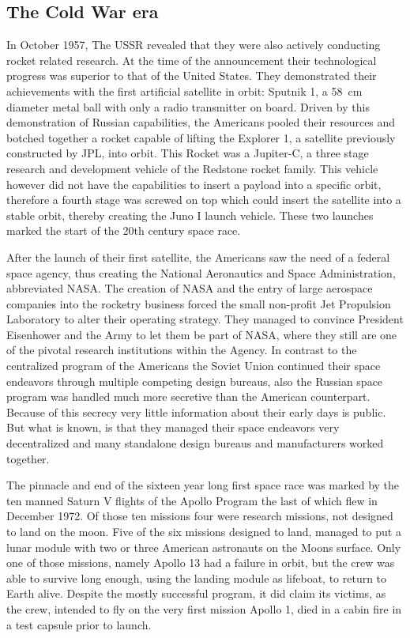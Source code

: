 \subsection{The Cold War era}

In October 1957, The USSR revealed that they were also actively conducting rocket related research. At the time of the announcement their technological progress was superior to that of the United States. They demonstrated their achievements with the first artificial satellite in orbit: Sputnik 1, a \SI{58}{\centi\meter} diameter metal ball with only a radio transmitter on board. Driven by this demonstration of Russian capabilities, the Americans pooled their resources and botched together a rocket capable of lifting the Explorer 1, a satellite previously constructed by JPL, into orbit. This Rocket was a Jupiter-C, a three stage research and development vehicle of the Redstone rocket family. This vehicle however did not have the capabilities to insert a payload into a specific orbit, therefore a fourth stage was screwed on top which could insert the satellite into a stable orbit, thereby creating the Juno I launch vehicle. These two launches marked the start of the 20th century space race.

After the launch of their first satellite, the Americans saw the need of a federal space agency, thus creating the National Aeronautics and Space Administration, abbreviated NASA. The creation of NASA and the entry of large aerospace companies into the rocketry business forced the small  non-profit Jet Propulsion Laboratory to alter their operating strategy. They managed to convince President Eisenhower and the Army to let them be part of NASA, where they still are one of the pivotal research institutions within the Agency. In contrast to the centralized program of the Americans the Soviet Union continued their space endeavors through multiple competing design bureaus, also the Russian space program was handled much more secretive than the American counterpart. Because of this secrecy very little information about their early days is public. But what is known, is that they managed their space endeavors very decentralized and many standalone design bureaus and manufacturers worked together.

The pinnacle and end of the sixteen year long first space race was marked by the ten manned Saturn V flights of the Apollo Program the last of which flew in December 1972. Of those ten missions four were research missions, not designed to land on the moon. Five of the six missions designed to land, managed to put a lunar module with two or three American astronauts on the Moons surface. Only one of those missions, namely Apollo 13 had a failure in orbit, but the crew was able to survive long enough, using the landing module as lifeboat, to return to Earth alive. Despite the  mostly successful program, it did claim its victims, as the crew, intended to fly on the very first mission Apollo 1, died in a cabin fire in a test capsule prior to launch. 

